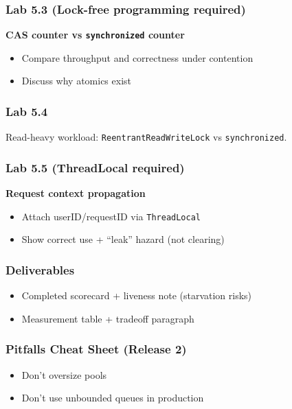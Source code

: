 \documentclass[11pt,a4paper]{article}
\begin{document}
	\subsubsection*{Lab 5.3 (Lock-free programming required)}
	\textbf{CAS counter vs \texttt{synchronized} counter}
	\begin{itemize}[leftmargin=*]
		\item Compare throughput and correctness under contention
		\item Discuss why atomics exist
	\end{itemize}
	
	\subsubsection*{Lab 5.4}
	Read-heavy workload: \texttt{ReentrantReadWriteLock} vs \texttt{synchronized}.
	
	\subsubsection*{Lab 5.5 (ThreadLocal required)}
	\textbf{Request context propagation}
	\begin{itemize}[leftmargin=*]
		\item Attach userID/requestID via \texttt{ThreadLocal}
		\item Show correct use + ``leak'' hazard (not clearing)
	\end{itemize}
	
	\subsubsection*{Deliverables}
	\begin{itemize}[leftmargin=*]
		\item Completed scorecard + liveness note (starvation risks)
		\item Measurement table + tradeoff paragraph
	\end{itemize}
	
	\subsubsection*{Pitfalls Cheat Sheet (Release 2)}
	\begin{itemize}[leftmargin=*]
		\item Don't oversize pools
		\item Don't use unbounded queues in production
	\end{itemize}
	
\end{document}
